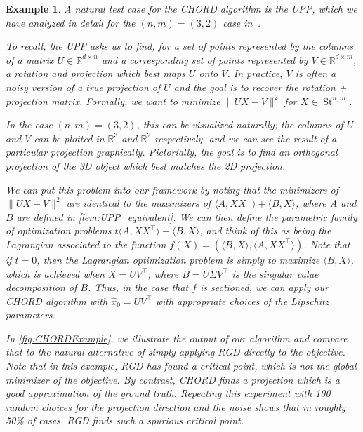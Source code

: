 \documentclass{article}
\numberwithin{equation}{section}
\newcommand{\R}{\mathbb{R}}
\newtheorem{example}{Example}[section]
\DeclareMathOperator{\St}{St}
\begin{document}
\begin{example}\label{ex:upp-bunny}
A natural test case for the CHORD algorithm is the UPP, which we have analyzed in detail for the $(n,m) = (3,2)$ case in~.

To recall, the UPP asks us to find, for a set of points represented by the columns of a matrix $U \in \R^{d \times n}$ and a corresponding set of points represented by $V \in \R^{d \times m}$, a rotation and projection which best maps $U$ onto $V$. In practice, $V$ is often a noisy version of a true projection of $U$ and the goal is to recover the rotation + projection matrix. Formally, we want to minimize $\|UX - V\|^2$ for $X \in \St^{n,m}$. 

In the case $(n,m) = (3,2)$, this can be visualized naturally; the columns of $U$ and $V$ can be plotted in $\R^3$ and $\R^2$ respectively, and we can see the result of a particular projection graphically. Pictorially, the goal is to find an orthogonal projection of the 3D object which best matches the 2D projection.

We can put this problem into our framework by noting that the minimizers of $\|UX - V\|^2$ are identical to the maximizers of $\langle A, XX^{\intercal}\rangle + \langle B, X\rangle$, where $A$ and $B$ are defined in \cref{lem:UPP_equivalent}. We can then define the parametric family of optimization problems $t\langle A, XX^{\intercal}\rangle + \langle B, X\rangle$, and think of this as being the Lagrangian associated to the function $f(X) = (\langle B, X\rangle, \langle A, XX^{\intercal}\rangle)$. Note that if $t = 0$, then the Lagrangian optimization problem is simply to maximize $\langle B, X\rangle$, which is achieved when $X= UV^{\intercal}$, where $B = U\Sigma V^{\intercal}$ is the singular value decomposition of $B$. Thus, in the case that $f$ is sectioned, we can apply our CHORD algorithm with $\hat{x}_0 = UV^{\intercal}$ with appropriate choices of the Lipschitz parameters.

In \cref{fig:CHORDExample}, we illustrate the output of our algorithm and compare that to the natural alternative of simply applying RGD directly to the objective. Note that in this example, RGD has found a critical point, which is not the global minimizer of the objective. By contrast, CHORD finds a projection which is a good approximation of the ground truth. Repeating this experiment with 100 random choices for the projection direction and the noise shows that in roughly 50\% of cases, RGD finds such a spurious critical point. 


\end{example}
\end{document}
